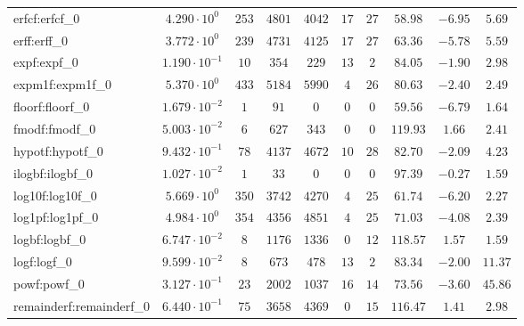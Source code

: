 \begin{tabular}{|l|c|c|c|c|c|c|c|c|c|}
erfcf:erfcf\_0           & $ 4.290 \cdot 10^{0}  $ & $ 253    $ & $ 4801   $ & $ 4042   $ & $ 17  $ & $ 27  $ & $ 58.98       $ & $ -6.95   $ & $ 5.69    $ \\
erff:erff\_0             & $ 3.772 \cdot 10^{0}  $ & $ 239    $ & $ 4731   $ & $ 4125   $ & $ 17  $ & $ 27  $ & $ 63.36       $ & $ -5.78   $ & $ 5.59    $ \\
expf:expf\_0             & $ 1.190 \cdot 10^{-1} $ & $ 10     $ & $ 354    $ & $ 229    $ & $ 13  $ & $ 2   $ & $ 84.05       $ & $ -1.90   $ & $ 2.98    $ \\
expm1f:expm1f\_0         & $ 5.370 \cdot 10^{0}  $ & $ 433    $ & $ 5184   $ & $ 5990   $ & $ 4   $ & $ 26  $ & $ 80.63       $ & $ -2.40   $ & $ 2.49    $ \\
floorf:floorf\_0         & $ 1.679 \cdot 10^{-2} $ & $ 1      $ & $ 91     $ & $ 0      $ & $ 0   $ & $ 0   $ & $ 59.56       $ & $ -6.79   $ & $ 1.64    $ \\
fmodf:fmodf\_0           & $ 5.003 \cdot 10^{-2} $ & $ 6      $ & $ 627    $ & $ 343    $ & $ 0   $ & $ 0   $ & $ 119.93      $ & $ 1.66    $ & $ 2.41    $ \\
hypotf:hypotf\_0         & $ 9.432 \cdot 10^{-1} $ & $ 78     $ & $ 4137   $ & $ 4672   $ & $ 10  $ & $ 28  $ & $ 82.70       $ & $ -2.09   $ & $ 4.23    $ \\
ilogbf:ilogbf\_0         & $ 1.027 \cdot 10^{-2} $ & $ 1      $ & $ 33     $ & $ 0      $ & $ 0   $ & $ 0   $ & $ 97.39       $ & $ -0.27   $ & $ 1.59    $ \\
log10f:log10f\_0         & $ 5.669 \cdot 10^{0}  $ & $ 350    $ & $ 3742   $ & $ 4270   $ & $ 4   $ & $ 25  $ & $ 61.74       $ & $ -6.20   $ & $ 2.27    $ \\
log1pf:log1pf\_0         & $ 4.984 \cdot 10^{0}  $ & $ 354    $ & $ 4356   $ & $ 4851   $ & $ 4   $ & $ 25  $ & $ 71.03       $ & $ -4.08   $ & $ 2.39    $ \\
logbf:logbf\_0           & $ 6.747 \cdot 10^{-2} $ & $ 8      $ & $ 1176   $ & $ 1336   $ & $ 0   $ & $ 12  $ & $ 118.57      $ & $ 1.57    $ & $ 1.59    $ \\
logf:logf\_0             & $ 9.599 \cdot 10^{-2} $ & $ 8      $ & $ 673    $ & $ 478    $ & $ 13  $ & $ 2   $ & $ 83.34       $ & $ -2.00   $ & $ 11.37   $ \\
powf:powf\_0             & $ 3.127 \cdot 10^{-1} $ & $ 23     $ & $ 2002   $ & $ 1037   $ & $ 16  $ & $ 14  $ & $ 73.56       $ & $ -3.60   $ & $ 45.86   $ \\
remainderf:remainderf\_0 & $ 6.440 \cdot 10^{-1} $ & $ 75     $ & $ 3658   $ & $ 4369   $ & $ 0   $ & $ 15  $ & $ 116.47      $ & $ 1.41    $ & $ 2.98    $ \\

\end{tabular}

